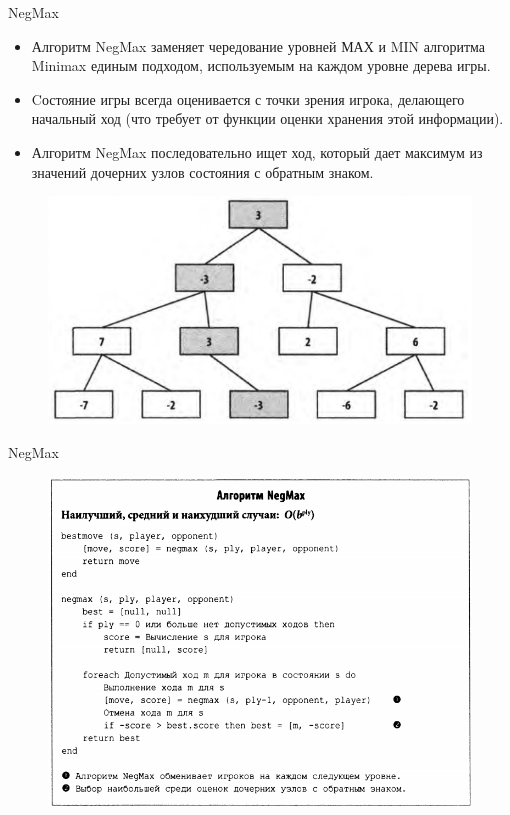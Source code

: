 \documentclass{beamer}
\begin{document}
\begin{frame}{NegMax}
\begin{itemize}
\item Алгоритм NegMax заменяет чередование уровней МАХ и MIN алгоритма Minimax
единым подходом, используемым на каждом уровне дерева игры.
\item Cостояние игры всегда оценивается с точки зрения игрока, делающего начальный ход (что требует от функции оценки хранения этой информации).
\item Алгоритм NegMax последовательно ищет ход, который дает
максимум из значений дочерних узлов состояния с обратным знаком.
\end{itemize}
\begin{figure}[h]
\centering
\includegraphics[scale=0.35]{images/lec05-pic05.png}
\end{figure}
\end{frame}

\begin{frame}{NegMax}
\begin{figure}[h]
\centering
\includegraphics[scale=0.4]{images/lec05-pic06.png}
\end{figure}
\end{frame}
\end{document}
